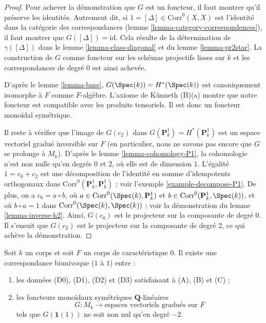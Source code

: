 \begin{proof}
\medskip\noindent
Pour achever la démonstration que $G$ est un foncteur,
il faut montrer qu'il préserve les identités. Autrement dit, si
$1 = [\Delta] \in \text{Corr}^0(X, X)$ est l'identité dans la catégorie
des correspondances (lemme \ref{lemma-category-correspondences}),
il faut montrer que $G([\Delta]) = \text{id}$.
Cela résulte de la détermination
de $\gamma([\Delta])$ dans le lemme \ref{lemma-class-diagonal}
et du lemme \ref{lemma-pr2star}.
La construction de $G$ comme foncteur sur les
schémas projectifs lisses sur $k$ et les correspondances de degré $0$ est ainsi achevée.

\medskip\noindent
D'après le lemme \ref{lemma-base},
$G(\Spec(k)) = H^*(\Spec(k))$ est canoniquement isomorphe à $F$
comme $F$-algèbre. L'axiome de K\"unneth (B)(a)
montre que notre foncteur est compatible avec les produits tensoriels.
Il est donc un foncteur monoïdal symétrique.

\medskip\noindent
Il reste à vérifier que l'image de $G(c_2)$ dans
$G(\mathbf{P}^1_k) = H^*(\mathbf{P}^1_k)$
est un espace vectoriel gradué inversible sur $F$ (en particulier, nous ne savons pas encore
que $G$ se prolonge à $M_k$). D'après le lemme \ref{lemma-cohomology-P1},
la cohomologie n'est non nulle qu'en degrés $0$ et $2$,
où elle est de dimension $1$. L'égalité $1 = c_0 + c_2$ est une décomposition
de l'identité en somme d'idempotents orthogonaux dans
$\text{Corr}^0(\mathbf{P}^1_k, \mathbf{P}^1_k)$ ; voir
l'exemple \ref{example-decompose-P1}. De plus, on a $c_0 = a \circ b$, où
$a \in \text{Corr}^0(\Spec(k), \mathbf{P}^1_k)$ et
$b \in \text{Corr}^0(\mathbf{P}^1_k, \Spec(k))$, et où
$b \circ a = 1$ dans $\text{Corr}^0(\Spec(k), \Spec(k))$ ; voir la démonstration du
lemme \ref{lemma-inverse-h2}. Ainsi, $G(c_0)$ est le projecteur
sur la composante de degré $0$. Il s'ensuit que $G(c_2)$ est
le projecteur sur la composante de degré $2$, ce qui achève la démonstration.
\end{proof}

\begin{proposition}
\label{proposition-weil-cohomology-theory}
Soit $k$ un corps et soit $F$ un corps de caractéristique $0$. Il existe
une correspondance biunivoque ($1$ à $1$) entre :
\begin{enumerate}
\item les données (D0), (D1), (D2) et (D3) satisfaisant à (A), (B) et (C) ;
\item les foncteurs monoïdaux symétriques $\mathbf{Q}$-linéaires
$$
G : M_k \longrightarrow \text{espaces vectoriels gradués sur }F\text{}
$$
tels que $G(\mathbf{1}(1))$ ne soit non nul qu'en degré $-2$.
\end{enumerate}
\end{proposition}

